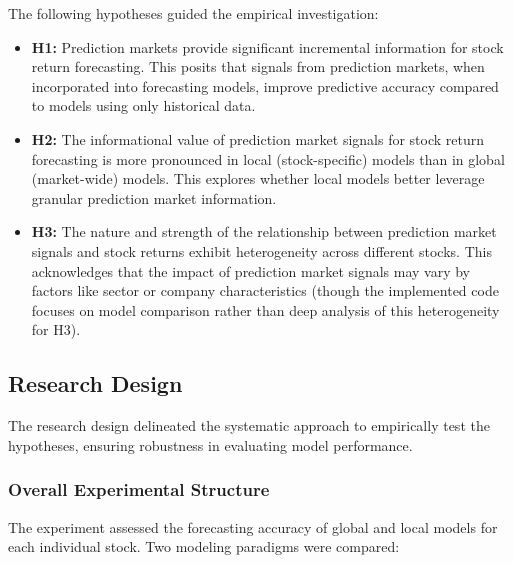 \documentclass[12pt]{report}
\begin{document}
The following hypotheses guided the empirical investigation:
\begin{itemize}
    \item \textbf{H1:} Prediction markets provide significant incremental information for stock return forecasting. This posits that signals from prediction markets, when incorporated into forecasting models, improve predictive accuracy compared to models using only historical data.


    \item \textbf{H2:} The informational value of prediction market signals for stock return forecasting is more pronounced in local (stock-specific) models than in global (market-wide) models. This explores whether local models better leverage granular prediction market information.


    \item \textbf{H3:} The nature and strength of the relationship between prediction market signals and stock returns exhibit heterogeneity across different stocks. This acknowledges that the impact of prediction market signals may vary by factors like sector or company characteristics (though the implemented code focuses on model comparison rather than deep analysis of this heterogeneity for H3).

\end{itemize}

\subsection{Research Design}
The research design delineated the systematic approach to empirically test the hypotheses, ensuring robustness in evaluating model performance.

\subsubsection{Overall Experimental Structure}

The experiment assessed the forecasting accuracy of global and local models for each individual stock. Two modeling paradigms were compared:
\end{document}

